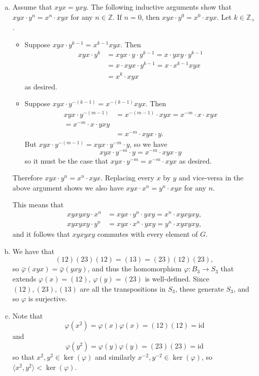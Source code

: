 \documentclass{article}
\begin{document}
\begin{Answer}
\begin{enumerate}[(a)]
  \item{
    Assume that $xyx = yxy$. The following inductive arguments show
    that $xyx \cdot y^n = x^n \cdot xyx$ for any $n \in \mathbb{Z}$.
    If $n = 0$, then $xyx \cdot y^0 = x^0 \cdot xyx$. Let $k \in \mathbb{Z}_+$.
    \begin{itemize}
      \item{
        Suppose $xyx \cdot y^{k-1} = x^{k-1} xyx$. Then
        \begin{align*}
             xyx \cdot y^k
          &= xyx \cdot y \cdot y^{k-1}
           = x \cdot yxy \cdot y^{k-1} \\
          &= x \cdot xyx \cdot y^{k-1}
           = x \cdot x^{k-1} xyx       \\
          &= x^k \cdot xyx
        \end{align*}
        as desired.
      }
      \item{
        Suppose $xyx \cdot y^{-(k-1)} = x^{-(k-1)} xyx$.
        Then
        \begin{align*}
             xyx \cdot y^{-(m-1)}
          &= x^{-(m-1)} \cdot xyx
           = x^{-m} \cdot x \cdot xyx \\
           = x^{-m} \cdot x \cdot yxy \\
          &= x^{-m} \cdot xyx \cdot y.
        \end{align*}
        But $xyx \cdot y^{-(m-1)} = xyx \cdot y^{-m} \cdot y$, so we
        have
        $$
        xyx \cdot y^{-m} \cdot y = x^{-m} \cdot xyx \cdot y
        $$
        so it must be the case that $xyx \cdot y^{-m} = x^{-m} \cdot
        xyx$ as desired.
      }
    \end{itemize}
    Therefore $xyx \cdot y^n = x^n \cdot xyx$. Replacing every $x$ by
    $y$ and vice-versa in the above argument shows we also have
    $xyx \cdot x^n = y^n \cdot xyx$ for any $n$.

    This means that
    \begin{align*}
        xyxyxy \cdot x^n
     &= xyx \cdot y^n \cdot yxy
      = x^n \cdot xyxyxy, \\
        xyxyxy \cdot y^n
     &= xyx \cdot x^n \cdot yxy
      = y^n \cdot xyxyxy,
    \end{align*}
    and it follows that $xyxyxy$ commutes with every element of $G$.
  }
  \item{
    We have that
    $$
    (12)(23)(12) = (13) = (23)(12)(23),
    $$
    so
    $\bar{\varphi}(xyx) = \bar{\varphi}(yxy)$, and thus the
    homomorphism $\varphi : B_3 \to S_3$ that extends
    $\varphi(x) = (12)$, $\varphi(y) = (23)$
    is well-defined.  Since $(12), (23), (13)$ are all the
    transpositions in $S_3$, these generate $S_3$,
    and so $\varphi$ is surjective.
  }
  \item{
    Note that
    $$
    \varphi(x^2) = \varphi(x)\varphi(x) = (12)(12) = \mathrm{id}
    $$
    and
    $$
    \varphi(y^2) = \varphi(y)\varphi(y) = (23)(23) = \mathrm{id}
    $$
    so that $x^2, y^2 \in \ker(\varphi)$ and similarly
    $x^{-2}, y^{-2} \in \ker(\varphi)$, so
    $\langle x^2, y^2 \rangle < \ker(\varphi)$.

}
\end{enumerate}
\end{Answer}
\end{document}
